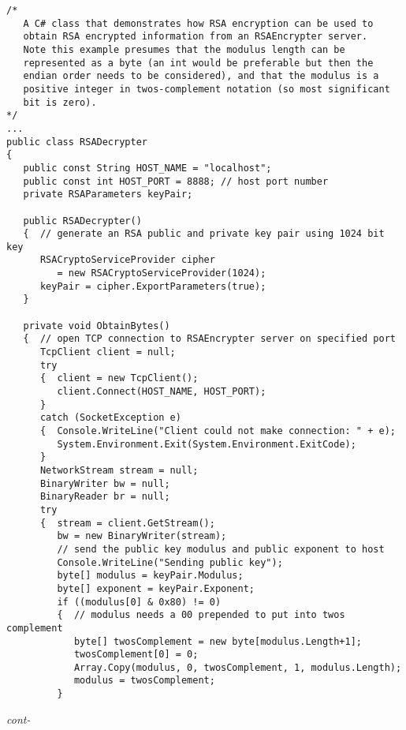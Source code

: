 \begin{figure*}\begin{program}\begin{verbatim}
/*
   A C# class that demonstrates how RSA encryption can be used to
   obtain RSA encrypted information from an RSAEncrypter server.
   Note this example presumes that the modulus length can be
   represented as a byte (an int would be preferable but then the
   endian order needs to be considered), and that the modulus is a
   positive integer in twos-complement notation (so most significant
   bit is zero).
*/
...
public class RSADecrypter
{
   public const String HOST_NAME = "localhost";
   public const int HOST_PORT = 8888; // host port number
   private RSAParameters keyPair;

   public RSADecrypter()
   {  // generate an RSA public and private key pair using 1024 bit key
      RSACryptoServiceProvider cipher
         = new RSACryptoServiceProvider(1024);
      keyPair = cipher.ExportParameters(true);
   }

   private void ObtainBytes()
   {  // open TCP connection to RSAEncrypter server on specified port
      TcpClient client = null;
      try
      {  client = new TcpClient();
         client.Connect(HOST_NAME, HOST_PORT);
      }
      catch (SocketException e)
      {  Console.WriteLine("Client could not make connection: " + e);
         System.Environment.Exit(System.Environment.ExitCode);
      }
      NetworkStream stream = null;
      BinaryWriter bw = null;
      BinaryReader br = null;
      try
      {  stream = client.GetStream();
         bw = new BinaryWriter(stream);
         // send the public key modulus and public exponent to host
         Console.WriteLine("Sending public key");
         byte[] modulus = keyPair.Modulus;
         byte[] exponent = keyPair.Exponent;
         if ((modulus[0] & 0x80) != 0)
         {  // modulus needs a 00 prepended to put into twos complement
            byte[] twosComplement = new byte[modulus.Length+1];
            twosComplement[0] = 0;
            Array.Copy(modulus, 0, twosComplement, 1, modulus.Length);
            modulus = twosComplement;
         }
\end{verbatim}\hfill \emph{cont-}\end{program}\end{figure*}%
